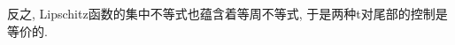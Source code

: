 \begin{example}[单位球面上的Lévy集中度]
%    
%    
%
%	
\end{example}


反之, Lipschitz函数的集中不等式也蕴含着等周不等式, 于是两种t对尾部的控制是等价的. 


